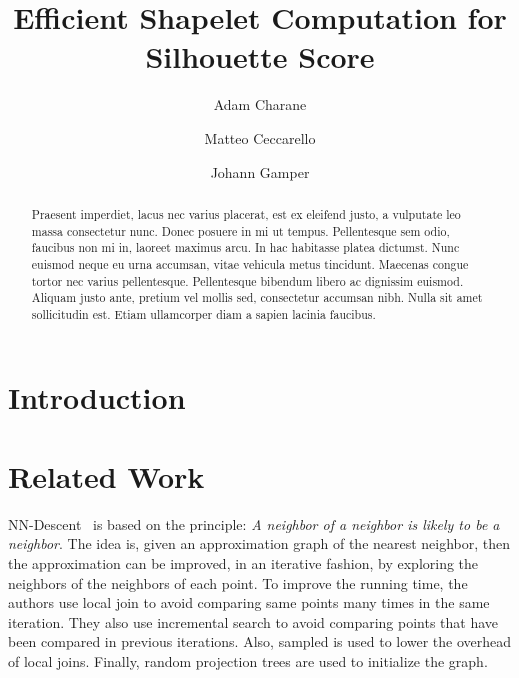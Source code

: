 \documentclass[sigconf, nonacm]{acmart}
\begin{document}
\title{Efficient Shapelet Computation for Silhouette Score}

\author{Adam Charane}

\author{Matteo Ceccarello}

\author{Johann Gamper}

\begin{abstract}
	Praesent imperdiet, lacus nec varius placerat, est ex eleifend justo, a vulputate leo massa consectetur nunc. Donec posuere in mi ut tempus. Pellentesque sem odio, faucibus non mi in, laoreet maximus arcu. In hac habitasse platea dictumst. Nunc euismod neque eu urna accumsan, vitae vehicula metus tincidunt. Maecenas congue tortor nec varius pellentesque. Pellentesque bibendum libero ac dignissim euismod. Aliquam justo ante, pretium vel mollis sed, consectetur accumsan nibh. Nulla sit amet sollicitudin est. Etiam ullamcorper diam a sapien lacinia faucibus.
\end{abstract}

\maketitle

\section{Introduction}

\section{Related Work}
NN-Descent~\cite{NN-Descent} is based on the principle: \textit{A neighbor of
a neighbor is likely to be a neighbor}. The idea is, given an approximation 
graph of the nearest neighbor, then the approximation can be improved, 
in an iterative fashion, by exploring the neighbors of the neighbors of each 
point. To improve the running time, the authors use local join to avoid 
comparing same points many times in the same iteration. They also use 
incremental search to avoid comparing points that have been compared in 
previous iterations. Also, sampled is used to lower the overhead of local 
joins. Finally, random projection trees are used to initialize the graph.



\end{document}
